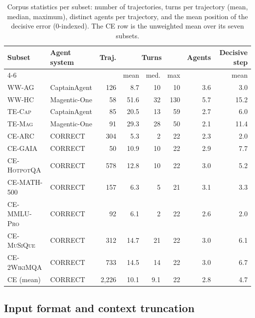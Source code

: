 \begin{table}[h]
\centering
\small
\setlength{\tabcolsep}{4.5pt}
\caption{Corpus statistics per subset: number of trajectories, turns per trajectory
(mean, median, maximum), distinct agents per trajectory, and the mean position of
the decisive error (0-indexed). The \textsc{CE} row is the unweighted mean over its seven
subsets.}
\label{tab:datasets}
\begin{tabular}{l l r rrr r r}
\toprule
Subset & Agent system & Traj. & \multicolumn{3}{c}{Turns} & Agents & Decisive step \\
\cmidrule(lr){4-6}
 & & & mean & med. & max & & mean \\
\midrule
\textsc{WW-AG}  & CaptainAgent & 126 & 8.7  & 10 & 10  & 3.6 & 3.0  \\
\textsc{WW-HC}  & Magentic-One & 58  & 51.6 & 32 & 130 & 5.7 & 15.2 \\
\textsc{TE-Cap} & CaptainAgent & 85  & 20.5 & 13 & 59  & 2.7 & 6.0  \\
\textsc{TE-Mag} & Magentic-One & 91  & 29.3 & 28 & 50  & 2.1 & 11.4 \\
\addlinespace[2pt]
\textsc{CE-ARC}      & CORRECT & 304 & 5.3  & 2  & 22 & 2.3 & 2.0 \\
\textsc{CE-GAIA}     & CORRECT & 50  & 10.9 & 10 & 22 & 2.9 & 7.7 \\
\textsc{CE-HotpotQA} & CORRECT & 578 & 12.8 & 10 & 22 & 3.0 & 5.2 \\
\textsc{CE-MATH-500} & CORRECT & 157 & 6.3  & 5  & 21 & 3.1 & 3.3 \\
\textsc{CE-MMLU-Pro} & CORRECT & 92  & 6.1  & 2  & 22 & 2.6 & 2.0 \\
\textsc{CE-MuSiQue}  & CORRECT & 312 & 14.7 & 21 & 22 & 3.0 & 6.1 \\
\textsc{CE-2WikiMQA} & CORRECT & 733 & 14.5 & 14 & 22 & 3.0 & 6.7 \\
\textsc{CE} (mean)   & CORRECT & 2{,}226 & 10.1 & 9.1 & 22 & 2.8 & 4.7 \\
\bottomrule
\end{tabular}
\end{table}

\subsection{Input format and context truncation}
\label{app:input}

